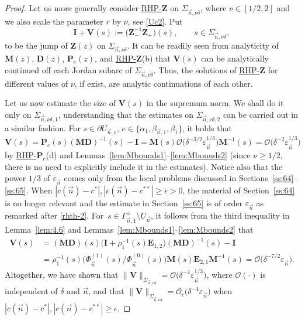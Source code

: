 \documentclass[10pt,a4paper]{amsart}
\numberwithin{equation}{section}
\newcommand{\n}{{\vec n}}
\newcommand{\rhp} {\textnormal{RHP}-${\boldsymbol P}$}
\newcommand{\rhz} {\textnormal{RHP}-${\boldsymbol Z}$}
\begin{document}
\begin{proof}
Let us more generally consider \hyperref[rhz]{\rhz} on $ \Sigma_{\n,\nu\delta} $, where $ \nu\in[1/2,2] $ and we also scale the parameter $ r $ by $ \nu $, see \eqref{Uc2}. Put
\[
\boldsymbol I + \boldsymbol V(s) := \bigl(\boldsymbol Z_-^{-1}\boldsymbol Z_+\bigr)(s), \qquad s\in \Sigma_{\n,\nu\delta}^\circ,
\]
to be the jump of $ \boldsymbol Z(z) $ on $ \Sigma_{\n,\nu\delta} $. It can be readily seen from analyticity of $ \boldsymbol M(z) $, $ \boldsymbol D(z) $, $ \boldsymbol P_e(z) $, and \hyperref[rhz]{\rhz}(b) that $ \boldsymbol V(s) $ can be analytically continued off each Jordan subarc of $ \Sigma_{\n,\nu\delta} $. Thus, the solutions of \hyperref[rhz]{\rhz} for different values of $ \nu $, if exist, are analytic continuations of each other.

Let us now estimate the size of $ \boldsymbol V(s) $ in the supremum norm. We shall do it only on $ \Sigma_{\n,\nu\delta,1} $, understanding that the estimates on $ \Sigma_{\n,\nu\delta,2} $ can be carried out in a similar fashion. For $ s\in\partial U_{\n,e} $, $ e\in \{\alpha_1,\beta_{\n,1},\beta_1\} $, it holds that
\[
\boldsymbol V(s) = \boldsymbol P_e(s) (\boldsymbol{MD})^{-1}(s) - \boldsymbol I = \boldsymbol M(s) \boldsymbol{\mathcal O} \bigl( \delta^{-3/2} \varepsilon_\n^{1/3} \bigr) \boldsymbol M^{-1}(s) = \boldsymbol{\mathcal O}\bigl( \delta^{-2} \varepsilon_\n^{1/3}\bigr)
\]
by \hyperref[rhp]{\rhp$_e$}(d) and Lemmas~\ref{lem:Mbounds1}--\ref{lem:Mbounds2} (since $ \nu\geq1/2 $, there is no need to explicitly include it in the estimates). Notice also that the power $ 1/3 $ of $ \varepsilon_\n $ comes only from the local problems discussed in Sections~\ref{ss:64}--\ref{ss:65}. When $ |c(\n)-c^\ast|,|c(\n)-c^{\ast\ast}|\geq\epsilon>0 $, the material of Section~\ref{ss:64} is no longer relevant and the estimate in Section~\ref{ss:65} is of order $ \varepsilon_\n $ as remarked after \eqref{rhth-2}. For~$ s\in \Gamma_{\n,1}^\pm\setminus U_\n $, it follows from the third inequality in Lemma~\ref{lem:4.6} and Lemmas~\ref{lem:Mbounds1}--\ref{lem:Mbounds2} that
\begin{align*}
\boldsymbol V(s) &= (\boldsymbol {MD})(s) \bigl(\boldsymbol I+\rho_1^{-1}(s)\boldsymbol E_{1,2}\bigr) (\boldsymbol{MD})^{-1}(s) - \boldsymbol I \\
& = \rho_1^{-1}(s) \bigl( \Phi_\n^{(1)}(s)/\Phi_\n^{(0)}(s) \bigr) \boldsymbol M(s)\boldsymbol E_{2,1}\boldsymbol M^{-1}(s) = \boldsymbol{\mathcal O}\bigl( \delta^{-7/2}\varepsilon_\n \bigr).
\end{align*}
Altogether, we have shown that $ \|\boldsymbol V\|_{\Sigma_{\n,\nu\delta}} = \mathcal O\bigl( \delta^{-4}\varepsilon_\n ^{1/3} \bigr) $, where $ \mathcal O(\cdot) $ is independent of $ \delta $ and $ \n $, and that $ \|\boldsymbol V\|_{\Sigma_{\n,\nu\delta}} = \mathcal O_\epsilon\bigl( \delta^{-4}\varepsilon_\n \bigr) $ when $ |c(\n)-c^\ast|,|c(\n)-c^{\ast\ast}|\geq\epsilon $.


\end{proof}
\end{document}
